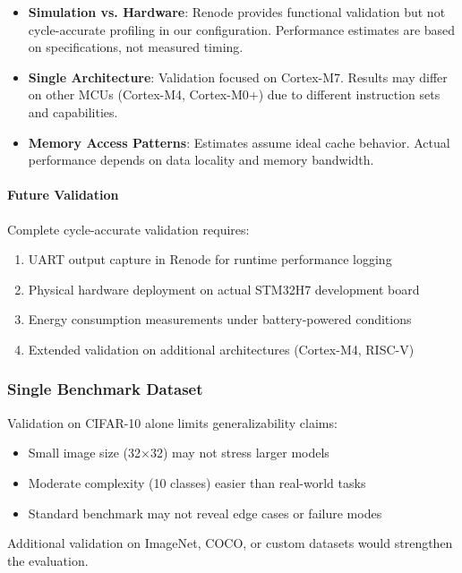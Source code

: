 \begin{itemize}
\item \textbf{Simulation vs. Hardware}: Renode provides functional validation but not cycle-accurate profiling in our configuration. Performance estimates are based on specifications, not measured timing.

\item \textbf{Single Architecture}: Validation focused on Cortex-M7. Results may differ on other MCUs (Cortex-M4, Cortex-M0+) due to different instruction sets and capabilities.

\item \textbf{Memory Access Patterns}: Estimates assume ideal cache behavior. Actual performance depends on data locality and memory bandwidth.
\end{itemize}

\paragraph{Future Validation}

Complete cycle-accurate validation requires:
\begin{enumerate}
\item UART output capture in Renode for runtime performance logging
\item Physical hardware deployment on actual STM32H7 development board
\item Energy consumption measurements under battery-powered conditions
\item Extended validation on additional architectures (Cortex-M4, RISC-V)
\end{enumerate}

\subsubsection{Single Benchmark Dataset}
Validation on CIFAR-10 alone limits generalizability claims:
\begin{itemize}
\item Small image size (32$\times$32) may not stress larger models
\item Moderate complexity (10 classes) easier than real-world tasks
\item Standard benchmark may not reveal edge cases or failure modes
\end{itemize}

Additional validation on ImageNet, COCO, or custom datasets would strengthen the evaluation.

